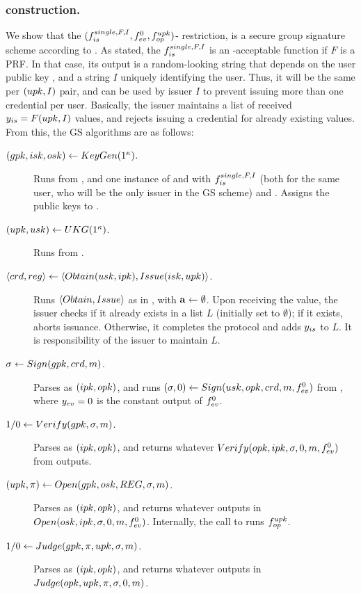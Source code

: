 \subsubsection{\CUASGS construction.} %
We show that the $(f_{is}^{single,F,I},f_{ev}^0,f_{op}^{upk})$-\CUASGen
restriction, is a secure group signature scheme according to \cite{bsz05}.
As stated, the $f_{is}^{single,F,I}$ is an \UAS-acceptable function if $F$ is a
PRF. In that case, its output is a random-looking string that depends on the
user public key \upk, and a string $I$ uniquely identifying the user. Thus, it
will be the same per $(upk,I)$ pair, and can be used by issuer $I$ to prevent
issuing more than one credential per user. Basically, the issuer maintains a
list of received $y_{is} = F(upk,I)$ values, and rejects issuing a credential
for already existing \yissue values. From this, the GS algorithms are as
follows:

\begin{description}
\item[$(gpk,isk,osk) \gets KeyGen(1^\kappa)$.] Runs \Setup from \CUASGen,
  and one instance of \KeyGen and \ISet with $f_{is}^{single,F,I}$ (both for
  the same user, who will be the only issuer in the GS scheme) and \OKeyGen.
  Assigns the public keys to \gpk.
\item[$(upk,usk) \gets UKG(1^\kappa)$.] Runs \KeyGen from \CUASGen.
\item[$\langle crd,reg \rangle \gets
  \langle Obtain(usk,ipk),Issue(isk,upk)\rangle$.] Runs $\langle Obtain,
  Issue\rangle$ as in \CUASGen, with $\mathbf{a} \gets \emptyset$. Upon receiving
  the \yissue value, the issuer checks if it already exists in a list $L$
  (initially set to $\emptyset$); if it exists, aborts issuance. Otherwise, it
  completes the protocol and adds $y_{is}$ to $L$. It is responsibility of the
  issuer to maintain $L$.
\item[$\sigma \gets Sign(gpk,crd,m)$.] Parses \gpk as $(ipk,opk)$, and
  runs $(\sigma,0) \gets Sign(usk,opk,crd,m,f_{ev}^0)$ from \CUASGen,
  where $y_{ev} = 0$ is the constant output of $f_{ev}^0$.
\item[$1/0 \gets Verify(gpk,\sigma,m)$.] Parses \gpk as $(ipk,opk)$, and
  returns whatever $Verify(opk,ipk,\sigma,0,m,f_{ev}^0)$ from \CUASGen
  outputs.
\item[$(\upk,\pi) \gets \Open(\gpk,\osk,\trans,\sig,\msg)$.] Parses \gpk as
  $(ipk,opk)$, and returns whatever \CUASGen outputs in $Open(osk,ipk,\sigma,
  0,m,f_{ev}^0)$. Internally, the call to \Open runs $f_{op}^{upk}$.
\item[$1/0 \gets Judge(gpk,\pi,upk,\sigma,m)$.] Parses \gpk as $(ipk,
  opk)$, and returns whatever \CUASGen outputs in $Judge(opk,upk,\pi,\sigma,
  0,m)$.
\end{description}

